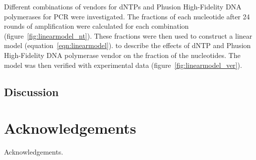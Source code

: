 \documentclass[parskip=full, numbers=noenddot]{scrreprt}
\begin{document}
Different combinations of vendors for dNTPs and Phusion High-Fidelity DNA polymerases for PCR were investigated.  The fractions of each nucleotide after 24 rounds of amplification were calculated for each combination (figure~\ref{fig:linearmodel_nt}).  These fractions were then used to construct a linear model (equation~\ref{eqn:linearmodel}).
to describe the effects of dNTP and Phusion High-Fidelity DNA polymerase vendor on the fraction of the nucleotides. The model was then verified with experimental data (figure~\ref{fig:linearmodel_ver}).

\section{Discussion}
\label{sec:pcrbias_discussion}

\chapter{Acknowledgements}
\label{ch:ack}

Acknowledgements.

\printbibliography
\end{document}
